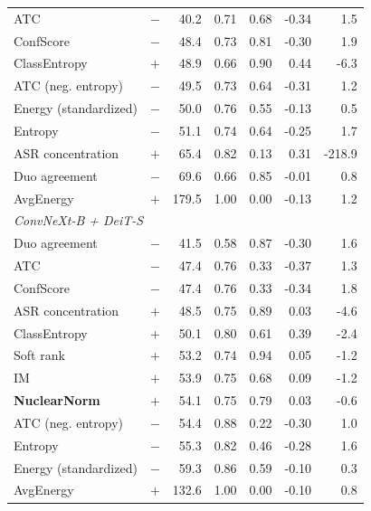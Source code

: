 \begin{table}[t]
\begin{tabular}{llrrrrr}
ATC & $-$ & 40.2 & 0.71 & 0.68 & -0.34 & 1.5 \\
ConfScore & $-$ & 48.4 & 0.73 & 0.81 & -0.30 & 1.9 \\
ClassEntropy & $+$ & 48.9 & 0.66 & 0.90 & 0.44 & -6.3 \\
ATC (neg. entropy) & $-$ & 49.5 & 0.73 & 0.64 & -0.31 & 1.2 \\
Energy (standardized) & $-$ & 50.0 & 0.76 & 0.55 & -0.13 & 0.5 \\
Entropy & $-$ & 51.1 & 0.74 & 0.64 & -0.25 & 1.7 \\
ASR concentration & $+$ & 65.4 & 0.82 & 0.13 & 0.31 & -218.9 \\
Duo agreement & $-$ & 69.6 & 0.66 & 0.85 & -0.01 & 0.8 \\
AvgEnergy & $+$ & 179.5 & 1.00 & 0.00 & -0.13 & 1.2 \\
\midrule
\multicolumn{7}{l}{\textit{ConvNeXt-B + DeiT-S}} \\
Duo agreement & $-$ & 41.5 & 0.58 & 0.87 & -0.30 & 1.6 \\
ATC & $-$ & 47.4 & 0.76 & 0.33 & -0.37 & 1.3 \\
ConfScore & $-$ & 47.4 & 0.76 & 0.33 & -0.34 & 1.8 \\
ASR concentration & $+$ & 48.5 & 0.75 & 0.89 & 0.03 & -4.6 \\
ClassEntropy & $+$ & 50.1 & 0.80 & 0.61 & 0.39 & -2.4 \\
Soft rank & $+$ & 53.2 & 0.74 & 0.94 & 0.05 & -1.2 \\
IM & $+$ & 53.9 & 0.75 & 0.68 & 0.09 & -1.2 \\
\textbf{NuclearNorm} & $+$ & 54.1 & 0.75 & 0.79 & 0.03 & -0.6 \\
ATC (neg. entropy) & $-$ & 54.4 & 0.88 & 0.22 & -0.30 & 1.0 \\
Entropy & $-$ & 55.3 & 0.82 & 0.46 & -0.28 & 1.6 \\
Energy (standardized) & $-$ & 59.3 & 0.86 & 0.59 & -0.10 & 0.3 \\
AvgEnergy & $+$ & 132.6 & 1.00 & 0.00 & -0.10 & 0.8 \\
\bottomrule
\end{tabular}
\end{table}
